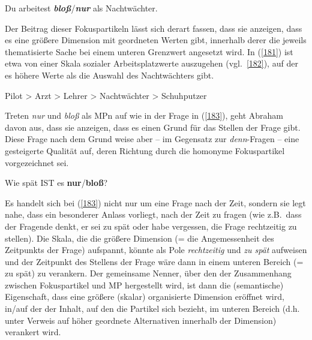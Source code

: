\begin{exe}
	\ex\label{181} 
	Du arbeitest \textit{\textbf{bloß}}/\textit{\textbf{nur}} als Nachtwächter.
	\hfill\hbox{\citet[101]{Abraham1995}}
\end{exe}	
Der Beitrag dieser Fokuspartikeln lässt sich derart fassen, dass sie anzeigen, dass es eine größere  Dimension mit geordneten Werten gibt, innerhalb derer die je\-weils thematisierte Sache bei einem unteren Grenzwert angesetzt wird. In (\ref{181}) ist etwa von einer Skala sozialer Arbeitsplatzwerte auszugehen (vgl.\ \ref{182}), auf der es höhere Werte als die Auswahl des Nachtwächters gibt.

\begin{exe}
	\ex\label{182} 
	Pilot > Arzt > Lehrer > Nachtwächter > Schuhputzer
\end{exe}	
Treten \textit{nur} und \textit{bloß} als MPn auf wie in der Frage in (\ref{183}), geht Abraham davon aus, dass sie anzeigen, dass es einen Grund für das Stellen der Frage gibt. Diese Frage nach dem Grund weise aber – im Gegensatz zur \textit{denn}-Fragen – eine gestei\-gerte Qualität auf, deren Richtung durch die homonyme Fokuspartikel vorgezeichnet sei.

\begin{exe}
	\ex\label{183} 
	Wie spät IST es \textbf{nur}/\textbf{bloß}?
	\hfill\hbox{\citet[101]{Abraham1995}}
\end{exe}												        		       
Es handelt sich bei (\ref{183}) nicht nur um eine Frage nach der Zeit, sondern sie legt nahe, dass ein besonderer Anlass vorliegt, nach der Zeit zu fragen (wie z.B.\ dass der Fragende denkt, er sei zu spät oder habe vergessen, die Frage rechtzeitig zu stellen). Die Skala, die die größere Dimension (= die Angemessenheit des Zeitpunkts der Frage) aufspannt, könnte als Pole \textit{rechtzeitig} und \textit{zu spät} aufweisen und der Zeitpunkt des Stellens der Frage wäre dann in einem unteren Bereich (= zu spät) zu verankern. Der gemeinsame Nenner, über den der Zusammenhang zwischen Fokuspartikel  und MP hergestellt wird, ist dann die (semantische) Eigenschaft, dass eine größere (skalar) organisierte Dimension eröffnet wird, in/auf der der Inhalt, auf den die Partikel sich bezieht, im unteren Bereich (d.h. unter Verweis auf höher geordnete Alternativen innerhalb der Dimension) verankert wird.

